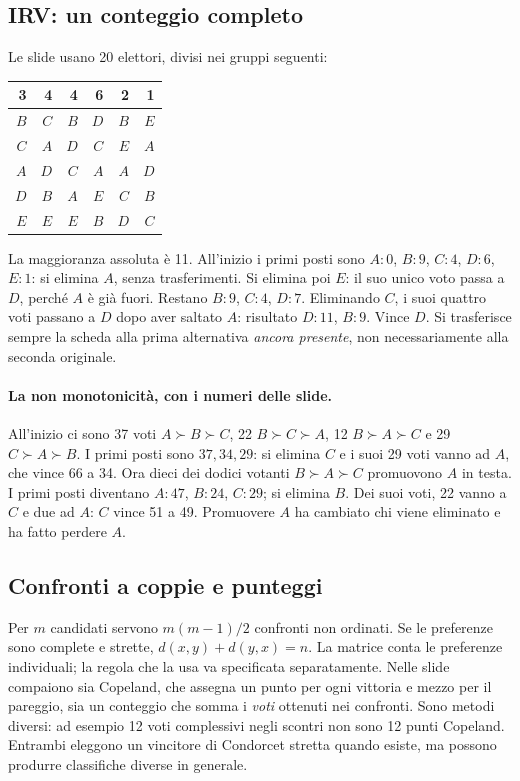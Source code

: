 \subsection{IRV: un conteggio completo}
Le slide usano 20 elettori, divisi nei gruppi seguenti:
\begin{center}
\begin{tabular}{rrrrrr}
\toprule
3 & 4 & 4 & 6 & 2 & 1 \\
\midrule
$B$ & $C$ & $B$ & $D$ & $B$ & $E$ \\
$C$ & $A$ & $D$ & $C$ & $E$ & $A$ \\
$A$ & $D$ & $C$ & $A$ & $A$ & $D$ \\
$D$ & $B$ & $A$ & $E$ & $C$ & $B$ \\
$E$ & $E$ & $E$ & $B$ & $D$ & $C$ \\
\bottomrule
\end{tabular}
\end{center}
La maggioranza assoluta è 11. All'inizio i primi posti sono $A:0$, $B:9$, $C:4$, $D:6$, $E:1$: si elimina $A$, senza trasferimenti. Si elimina poi $E$: il suo unico voto passa a $D$, perché $A$ è già fuori. Restano $B:9$, $C:4$, $D:7$. Eliminando $C$, i suoi quattro voti passano a $D$ dopo aver saltato $A$: risultato $D:11$, $B:9$. Vince $D$. Si trasferisce sempre la scheda alla prima alternativa \emph{ancora presente}, non necessariamente alla seconda originale.

\paragraph{La non monotonicità, con i numeri delle slide.} All'inizio ci sono 37 voti $A\succ B\succ C$, 22 $B\succ C\succ A$, 12 $B\succ A\succ C$ e 29 $C\succ A\succ B$. I primi posti sono $37,34,29$: si elimina $C$ e i suoi 29 voti vanno ad $A$, che vince 66 a 34. Ora dieci dei dodici votanti $B\succ A\succ C$ promuovono $A$ in testa. I primi posti diventano $A:47$, $B:24$, $C:29$; si elimina $B$. Dei suoi voti, 22 vanno a $C$ e due ad $A$: $C$ vince 51 a 49. Promuovere $A$ ha cambiato chi viene eliminato e ha fatto perdere $A$.

\subsection{Confronti a coppie e punteggi}
Per $m$ candidati servono $m(m-1)/2$ confronti non ordinati. Se le preferenze sono complete e strette, $d(x,y)+d(y,x)=n$. La matrice conta le preferenze individuali; la regola che la usa va specificata separatamente. Nelle slide compaiono sia Copeland, che assegna un punto per ogni vittoria e mezzo per il pareggio, sia un conteggio che somma i \emph{voti} ottenuti nei confronti. Sono metodi diversi: ad esempio 12 voti complessivi negli scontri non sono 12 punti Copeland. Entrambi eleggono un vincitore di Condorcet stretta quando esiste, ma possono produrre classifiche diverse in generale.

